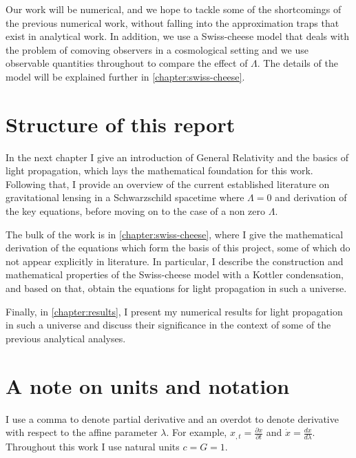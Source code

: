Our work will be numerical, and we hope to tackle some of the shortcomings of the previous numerical work, without falling into the approximation traps that exist in analytical work. In addition, we use a Swiss-cheese model that deals with the problem of comoving observers in a cosmological setting and we use observable quantities throughout to compare the effect of $\Lambda$. The details of the model will be explained further in \autoref{chapter:swiss-cheese}.

\section{Structure of this report}
In the next chapter I give an introduction of General Relativity and the basics of light propagation, which lays the mathematical foundation for this work. Following that, I provide an overview of the current established literature on gravitational lensing in a Schwarzschild spacetime where $\Lambda = 0$ and derivation of the key equations, before moving on to the case of a non zero $\Lambda$. 

The bulk of the work is in \autoref{chapter:swiss-cheese}, where I give the mathematical derivation of the equations which form the basis of this project, some of which do not appear explicitly in literature. In particular, I describe the construction and mathematical properties of the Swiss-cheese model with a Kottler condensation, and based on that, obtain the equations for light propagation in such a universe. 

Finally, in \autoref{chapter:results}, I present my numerical results for light propagation in such a universe and discuss their significance in the context of some of the previous analytical analyses. 

\section{A note on units and notation}
I use a comma to denote partial derivative and an overdot to denote derivative with respect to the affine parameter $\lambda$. For example, $x_{,t} = \frac{\partial x}{\partial t}$ and $\dot{x} = \frac{dx}{d\lambda}$. Throughout this work I use natural units $c = G = 1$. 
